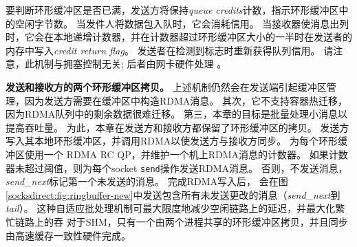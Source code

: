 要判断环形缓冲区是否已满，发送方将保持\textit {queue credits}计数，指示环形缓冲区中的空闲字节数。
当发件人将数据包入队时，它会消耗信用。 当接收器使消息出列时，它会在本地递增计数器，并在计数器超过环形缓冲区大小的一半时在发送者的内存中写入\textit {credit return flag}。 发送者在检测到标志时重新获得队列信用。
请注意，此机制与拥塞控制无关; 后者由网卡硬件处理 \cite {zhu2015congestion}。

\textbf {发送和接收方的两个环形缓冲区拷贝。}
上述机制仍然会在发送端引起缓冲区管理，因为发送方需要在缓冲区中构造RDMA消息。
其次，它不支持容器热迁移，因为RDMA队列中的剩余数据很难迁移。
第三，本章的目标是批量处理小消息以提高吞吐量。
为此，本章在发送方和接收方都保留了环形缓冲区的拷贝。
发送方写入其本地环形缓冲区，并调用RDMA以使发送方与接收方同步。
\libipc{} 为每个环形缓冲区使用一个 RDMA RC QP，并维护一个机上RDMA消息的计数器。
如果计数器未超过阈值，则为每个socket \texttt {send}操作发送RDMA消息。
否则，不发送消息，\emph {send\_next}标记第一个未发送的消息。
完成RDMA写入后，\libipc{} 会在图 \ref {socksdirect:fig:ringbuffer-new}中发送包含所有未发送更改的消息（\emph {send\_next}到\emph {tail}）。
这种自适应批处理机制可最大限度地减少空闲链路上的延迟，并最大化繁忙链路上的吞
对于SHM，只有一个由两个进程共享的环形缓冲区拷贝，并且同步由高速缓存一致性硬件完成。




